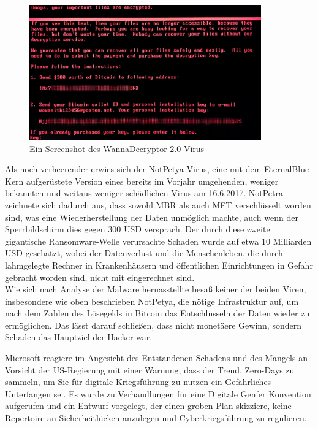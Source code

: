 \documentclass[DIV=12,headings=normal,pdftex,headinclude=false,footinclude=false,final]{scrreprt}
\begin{document}
\begin{figure}[H]
    \centering
    \includegraphics[width=10cm]{notpetya_ransomware.jpg}
    \caption[NotPetya Screenshot, Nutzer ''GrEat''/Kaspersky, URL: <https://media.kasperskydaily.com/wp-content/uploads/sites/92/2017/06/27133735/wannamore-ransomware-screenshot.jpg>]{Ein Screenshot des WannaDecryptor 2.0 Virus}
    \label{img:not_petya}
\end{figure}

\noindent
Als noch verheerender erwies sich der NotPetya Virus, eine mit dem EternalBlue-Kern aufgerüstete Version eines bereits im Vorjahr umgehenden, weniger bekannten und weitaus weniger schädlichen Virus am 16.6.2017. NotPetra zeichnete sich dadurch aus, dass sowohl MBR als auch MFT verschlüsselt worden sind, was eine Wiederherstellung der Daten unmöglich machte, auch wenn der Sperrbildschirm dies gegen 300 USD versprach. Der durch diese zweite gigantische Ransomware-Welle verursachte Schaden wurde auf etwa 10 Milliarden USD geschätzt, wobei der Datenverlust und die Menschenleben, die durch lahmgelegte Rechner in Krankenhäusern und öffentlichen Einrichtungen in Gefahr gebracht worden sind, nicht mit eingerechnet sind\cite{Avast}.\\
Wie sich nach Analyse der Malware heruasstellte besaß keiner der beiden Viren, insbesondere wie oben beschrieben NotPetya, die nötige Infrastruktur auf, um nach dem Zahlen des Lösegelds in Bitcoin das Entschlüsseln der Daten wieder zu ermöglichen. Das lässt darauf schließen, dass nicht monetäere Gewinn, sondern Schaden das Hauptziel der Hacker war\cite{Sil}.


\noindent
Microsoft reagiere im Angesicht des Entstandenen Schadens und des Mangels an Vorsicht der US-Regierung mit einer Warnung, dass der Trend, Zero-Days zu sammeln, um Sie für digitale Kriegsführung zu nutzen ein Gefährliches Unterfangen sei. Es wurde zu Verhandlungen für eine Digitale Genfer Konvention aufgerufen und ein Entwurf vorgelegt, der einen groben Plan skizziere, keine Repertoire an Sicherheitlücken anzulegen und Cyberkriegsführung zu regulieren\cite{MS:EB}.
\end{document}

